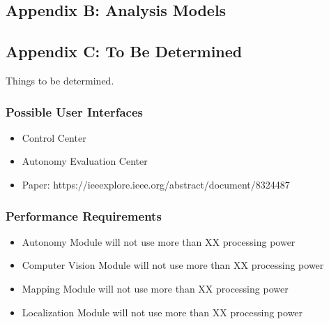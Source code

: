 \subsection{Appendix B: Analysis Models}
\label{sec:analysis}

\subsection{Appendix C: To Be Determined}
\label{sec:tbd}

Things to be determined.

\subsubsection*{Possible User Interfaces}
\label{sec:possible_user_interfaces}
\begin{itemize}
        \item Control Center 
        \item Autonomy Evaluation Center 
        \item Paper: https://ieeexplore.ieee.org/abstract/document/8324487 
\end{itemize}

\subsubsection*{Performance Requirements}
\label{sec:performance_requirements}
    \begin{itemize}
        \item Autonomy Module will not use more than XX processing power 
        \item Computer Vision Module will not use more than XX processing power 
        \item Mapping Module will not use more than XX processing power 
        \item Localization Module will not use more than XX processing power
    \end{itemize}

